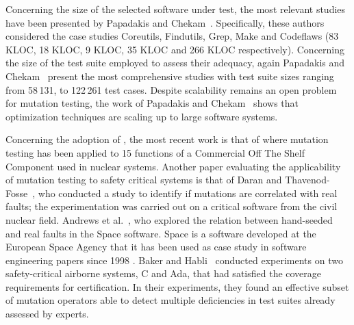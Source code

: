 Concerning the size of the selected software under test, the most relevant studies have been presented by Papadakis and Chekam~\cite{papadakis2018mutation,chekam2017empirical,papadakis2018mutant}. Specifically, these authors considered the case studies Coreutils, Findutils, Grep, Make and Codeflaws (83 KLOC, 18 KLOC, 9 KLOC, 35 KLOC and 266 KLOC respectively). 
Concerning the size of the test suite employed to assess their adequacy, again Papadakis and Chekam~\cite{papadakis2018mutation,chekam2017empirical,papadakis2018mutant} present the most comprehensive studies with test suite sizes ranging from 58\,131, to 122\,261 test cases.
Despite scalability remains an open problem for mutation testing, the work of Papadakis and Chekam~\cite{papadakis2018mutation,chekam2017empirical,papadakis2018mutant} shows that optimization techniques are scaling up to large software systems.

Concerning the adoption of , the most recent work is that of \cite{delgado2018evaluation} where mutation testing has been applied to 15 functions of a Commercial Off The Shelf Component used in nuclear systems. 
Another paper evaluating the applicability of mutation testing to safety critical systems is that of Daran and Thavenod-Fosse~\cite{daran1996software}, who conducted a study to identify if mutations are correlated with real faults; the experimentation was carried out on a critical software from the civil nuclear field. Andrews et al.~\cite{andrews2005mutation}, who explored the relation between hand-seeded and real faults in the Space software. Space is a software developed at the European Space Agency that it has been used as case study in software engineering papers since 1998 \cite{frankl1998further}.
Baker and Habli~\cite{baker2012empirical} conducted experiments on two safety-critical airborne systems, C and Ada, that had satisfied the coverage requirements for certification. In their experiments, they found an effective subset of mutation operators able to detect multiple deficiencies in test suites already assessed by experts. 



